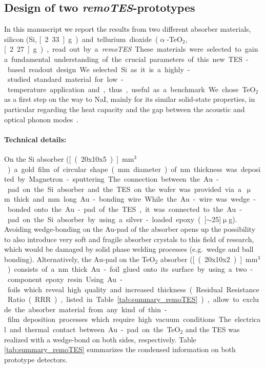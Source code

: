 \documentclass[superscriptaddress,nofootinbib ]{revtex4-2}
\begin{document}
\subsection{Design of two \textit{remoTES}-prototypes}
In this manuscript we report the results from two different absorber materials, silicon (Si, \unit[2.33]{g}) and tellurium dioxide ($\upalpha$-TeO$_2$, \unit[2.27]{g}), read out by a \textit{remoTES}. These materials were selected to gain a fundamental understanding of the crucial parameters of this new TES-based readout design. We selected Si as it is a highly-studied standard material for low-temperature application and, thus, useful as a benchmark. We chose TeO$_{2}$ as a first step on the way to NaI, mainly for its similar solid-state properties, in particular regarding the heat capacity and the gap between the acoustic and optical phonon modes~\cite{jainmaterials, hinuma2017band}. 

\paragraph*{Technical details:} On the Si absorber (\unit[(20x10x5)]{mm$^3$}) a gold film of circular shape (\unit[3]{mm} diameter) of \unit[200]{nm} thickness was deposited by Magnetron-sputtering. The connection between the Au-pad on the Si absorber and the TES on the wafer was provided via a \unit[17]{$\upmu$m} thick and \unit[2-3]{mm} long Au-bonding wire. While the Au-wire was wedge-bonded onto the Au-pad of the TES, it was connected to the Au-pad on the Si absorber by using a silver-loaded epoxy (\unit[$\sim$25]{$\upmu$g}). Avoiding wedge-bonding on the Au-pad of the absorber opens up the possibility to also introduce very soft and fragile absorber crystals to this field of research, which would be damaged by solid phase welding processes (e.g.~wedge and ball bonding).
Alternatively, the Au-pad on the TeO$_{2}$ absorber (\unit[(20x10x2)]{mm$^3$}) consists of a \unit[400]{nm} thick Au-foil glued onto its surface by using a two-component epoxy resin. Using Au-foils which reveal high quality and increased thickness (Residual Resistance Ratio (RRR), listed in Table \ref{tab:summary_remoTES}), allow to exclude the absorber material from any kind of thin-film deposition processes which require high vacuum conditions. The electrical and thermal contact between Au-pad on the TeO$_{2}$ and the TES was realized with a wedge-bond on both sides, respectively. Table \ref{tab:summary_remoTES} summarizes the condensed information on both prototype detectors.
\end{document}
